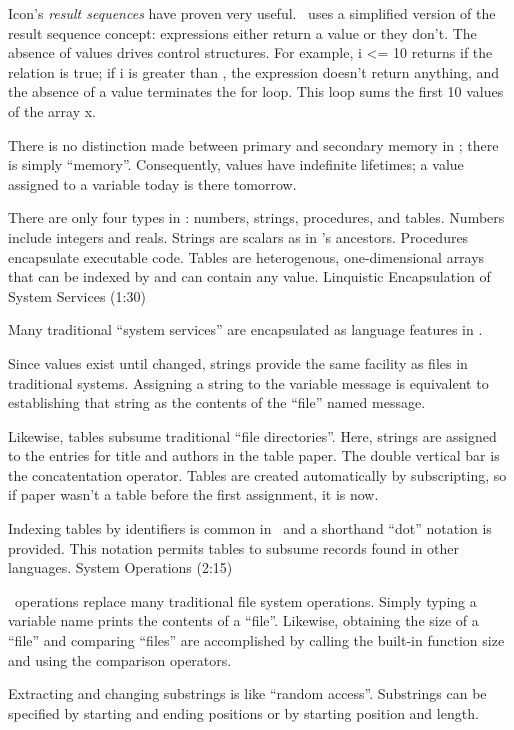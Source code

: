 Icon's {\sl result sequences\/} have proven very useful.
\EZ\ uses a simplified version of the result sequence
concept: expressions either return a value or they don't.
The absence of values drives control structures.
For example, {\pt i <= 10} returns {} if the relation is true;
if {\pt i} is greater than {}, the expression doesn't
return anything, and the absence of a value terminates
the for loop.
This loop sums the first 10 values of the array {\pt x}.

There is no distinction made between primary and secondary memory in \EZ;
there is simply ``memory''.
Consequently, values have indefinite lifetimes; a value assigned
to a variable today is there tomorrow.

There are only four types in \EZ: numbers, strings, procedures,
and tables.
Numbers include integers and reals.
Strings are scalars as in \EZ's ancestors.
Procedures encapsulate executable code.
Tables are heterogenous, one-dimensional arrays
that can be indexed by and can contain any value.
\NewPage
\beginsection Linquistic Encapsulation of System Services (1:30)

Many traditional ``system services'' are encapsulated
as language features in \EZ.

Since values exist until changed,
strings provide the same facility as files in traditional systems.
Assigning a string to the variable {\pt message}
is equivalent to establishing that
string as the contents of the ``file'' named {\pt message}.

Likewise, tables subsume traditional ``file directories''.
Here, strings are assigned
to the entries for {\pt title \rm and \pt authors}
in the table {\pt paper}.
The double vertical bar is the concatentation operator.
Tables are created automatically by subscripting,
so if {\pt paper} wasn't a table before the first assignment, it is now.

Indexing tables by identifiers is common in \EZ\ and a shorthand
``dot'' notation is provided.
This notation permits tables to subsume records found in other
languages.
\NewPage\Longtrue
\beginsection System Operations (2:15)

\EZ\ operations replace many traditional file system operations.
Simply typing a variable name prints the contents of a ``file''.
Likewise, obtaining the size of a ``file'' and comparing ``files''
are accomplished by calling the built-in function {\pt size}
and using the comparison operators.

Extracting and changing substrings is like ``random access''.
Substrings can be specified by starting and ending positions
or by starting position and length.

